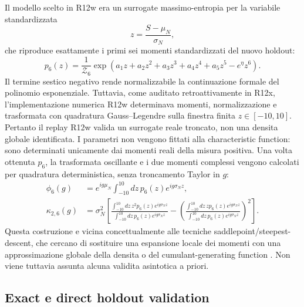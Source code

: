 \documentclass[11pt,a4paper]{article}
\begin{document}
Il modello scelto in R12w era un surrogate massimo-entropia per la variabile standardizzata
\begin{equation}
z=\frac{S-\mu_N}{\sigma_N},
\end{equation}
che riproduce esattamente i primi sei momenti standardizzati del nuovo holdout:
\begin{equation}
 p_6(z)=\frac{1}{\mathcal Z_6}\exp\!\left(a_1z+a_2z^2+a_3z^3+a_4z^4+a_5z^5-e^{\eta}z^6\right).
 \label{eq:r12w_maxent}
\end{equation}
Il termine sestico negativo rende normalizzabile la continuazione formale del polinomio esponenziale. Tuttavia, come auditato retroattivamente in R12x, l'implementazione numerica R12w determinava momenti, normalizzazione e trasformata con quadratura Gauss--Legendre sulla finestra finita $z\in[-10,10]$. Pertanto il replay R12w valida un surrogate reale troncato, non una densita globale identificata. I parametri non vengono fittati alla characteristic function: sono determinati unicamente dai momenti reali della misura positiva. Una volta ottenuta $p_6$, la trasformata oscillante e i due momenti complessi vengono calcolati per quadratura deterministica, senza troncamento Taylor in $g$:
\begin{align}
 \phi_6(g)&=e^{ig\mu_N}\int_{-10}^{10} dz\,p_6(z)e^{ig\sigma_Nz},\\
 \kappa_{2,6}(g)&=\sigma_N^2\left[\frac{\int_{-10}^{10} dz\,z^2p_6(z)e^{ig\sigma_Nz}}{\int_{-10}^{10} dz\,p_6(z)e^{ig\sigma_Nz}}-
 \left(\frac{\int_{-10}^{10} dz\,zp_6(z)e^{ig\sigma_Nz}}{\int_{-10}^{10} dz\,p_6(z)e^{ig\sigma_Nz}}\right)^2\right].
 \label{eq:r12w_fourier}
\end{align}
Questa costruzione e vicina concettualmente alle tecniche saddlepoint/steepest-descent, che cercano di sostituire una espansione locale dei momenti con una approssimazione globale della densita o del cumulant-generating function \cite{Daniels1954,LundeKleppeSkaug2018}. Non viene tuttavia assunta alcuna validita asintotica a priori.

\subsection{Exact e direct holdout validation}
\end{document}
